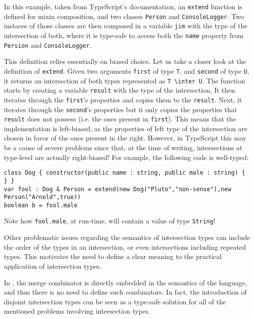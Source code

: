 In this example, taken from TypeScript's documentation, an \lstinline$extend$ function is defined 
for mixin composition, and two classes \lstinline$Person$ and \lstinline$ConsoleLogger$. 
Two instaces of those classes are then composed in a variable \lstinline$jim$ with the type of 
the intersection of both, where it is type-safe to access both the \lstinline$name$ property
from \lstinline$Persion$ and \lstinline$ConsoleLogger$.

This definition relies essentially on biased choice.
Let us take a closer look at the definition of \lstinline$extend$.
Given two arguments \lstinline$first$ of type \lstinline$T$, and \lstinline$second$ of type 
\lstinline $U$, it returns an intersection of both types represented as \lstinline$T \inter U$.
The function starts by creating a variable \lstinline$result$ with the type of the intersection, 
It then iterates through the \lstinline$first$'s properties and copies them to the 
\lstinline$result$.
Next, it iterates through the \lstinline$second$'s properties but it only copies the properties
that \lstinline$result$ does not possess (i.e. the ones present in \lstinline$first$).
This means that the implementation is left-biased, as the properties of left type of the intersection
are chosen in favor of the ones present in the right.
However, in TypeScript this may be a cause of severe problems since that, at the time of writing,
intersections at type-level are actually right-biased!
For example, the following code is well-typed:

\begin{lstlisting}
class Dog { constructor(public name : string, public male : string) { } }
var fool : Dog & Person = extend(new Dog("Pluto","non-sense"),new Person("Arnold",true))
boolean b = fool.male
\end{lstlisting}
Note how \lstinline$fool.male$, at run-time, will contain a value of type \lstinline$String$! 

Other problematic issues regarding the semantics of intersection types can include the order of 
the types in an intersection, or even intersections including repeated types.
This motivates the need to define a clear meaning to the practical application of 
intersection types.

In \name, the merge combinator is directly embedded in the semantics of the language, 
and thus there is no need to define such combinators.
In fact, the introduction of disjoint intersection types can be seen as a type-safe 
solution for all of the mentioned problems involving intersection types. 

